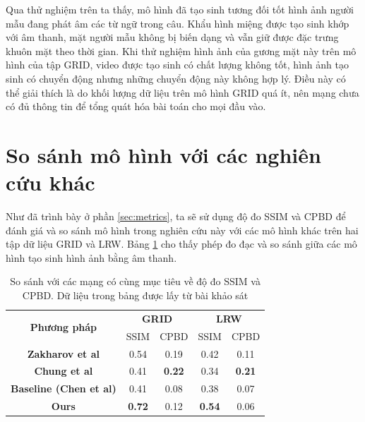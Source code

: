 Qua thử nghiệm trên ta thấy, mô hình đã tạo sinh tương đối tốt hình ảnh người mẫu đang phát âm các từ ngữ trong câu. Khẩu hình miệng được tạo sinh khớp với âm thanh, mặt người mẫu không bị biến dạng và vẫn giữ được đặc trưng khuôn mặt theo thời gian. Khi thử nghiệm hình ảnh của gương mặt này trên mô hình của tập GRID, video được tạo sinh  có chất lượng không tốt, hình ảnh tạo sinh có chuyển động nhưng những chuyển động này không hợp lý. Điều này có thể giải thích là do khối lượng dữ liệu trên mô hình GRID quá ít, nên mạng chưa có đủ thông tin để tổng quát hóa bài toán cho mọi đầu vào.

\section{So sánh mô hình với các nghiên cứu khác}

Như đã trình bày ở phần \ref{sec:metrics}, ta sẽ sử dụng độ đo SSIM và CPBD để đánh giá và so sánh mô hình trong nghiên cứu này với các mô hình khác trên hai tập dữ liệu GRID và LRW. Bảng \ref{table:metrics_result} cho thấy phép đo đạc và so sánh giữa các mô hình tạo sinh hình ảnh bằng âm thanh.

\begin{table}[h]
    \centering
    \begin{tabular}{c | c | c | c | c}
    \hline 
    \multirow{2}{*}{\textbf{Phương pháp}} & \multicolumn{2}{c|}{\textbf{GRID}} & \multicolumn{2}{c}{\textbf{LRW}}\\
    \cline{2-5}
    & SSIM & CPBD & SSIM & CPBD\\
    \hline
    \textbf{Zakharov et al \cite{zakharov}} & 0.54 & 0.19 & 0.42 & 0.11 \\
    \textbf{Chung et al \cite{chung}} & 0.41 & \textbf{0.22} & 0.34 & \textbf{0.21} \\
    \textbf{Baseline (Chen et al) \cite{chen2019}} & 0.41 & 0.08 & 0.38 & 0.07 \\
    \hline
    \hline
    \textbf{Ours} & \textbf{0.72} & 0.12 & \textbf{0.54} & 0.06 \\
    \hline
    \end{tabular}
    \caption{So sánh với các mạng có cùng mục tiêu về độ đo SSIM và CPBD. Dữ liệu trong bảng được lấy từ bài khảo sát \cite{chen_survey}}
    \label{table:metrics_result}
\end{table}

